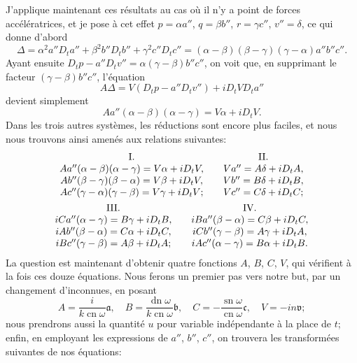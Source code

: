 \documentclass[11pt,leqno,oneside,letterpaper]{book}[2005/09/16]
\DeclareMathOperator{\sn}{sn}
\DeclareMathOperator{\cn}{cn}
\DeclareMathOperator{\dn}{dn}
\begin{document}
J'applique maintenant ces r\'esultats au cas o\`u il n'y a point de forces
acc\'el\'eratrices, et je pose \`a cet effet
$p=\alpha a''$, $q=\beta b''$, $r=\gamma c''$, $v''=\delta$, ce qui donne d'abord
\[
\Delta = \alpha^2 a'' D_t a'' + \beta^2 b'' D_t b'' + \gamma^2 c'' D_t c''
  = (\alpha-\beta)(\beta-\gamma)(\gamma-\alpha) a'' b'' c''.
\]
Ayant ensuite $D_t p - a'' D_t v'' = \alpha(\gamma-\beta)b''c''$, on voit que, en supprimant le
facteur $(\gamma-\beta)b''c''$, l'\'equation
\[
A\Delta = V (D_t p - a'' D_t v'') + i D_t V D_t a''
\]
devient simplement
\[
Aa'' (\alpha-\beta)(\alpha-\gamma) = V\alpha + i D_t V.
\]
Dans les trois autres syst\`emes, les r\'eductions sont encore plus faciles, et
nous nous trouvons ainsi amen\'es aux relations suivantes:
\begin{gather*}
\begin{array}{c@{\qquad}c}
\text{I.} & \text{II.} \\
Aa''(\alpha -  \beta)(\alpha-\gamma) = V\alpha + iD_t V,
  & Va'' = A\delta + iD_t A, \\
Ab''(\beta  - \gamma)(\beta -\alpha) = V\beta  + iD_t V,
  & Vb'' = B\delta + iD_t B, \\
Ac''(\gamma - \alpha)(\gamma-\beta ) = V\gamma + iD_t V;
  & Vc'' = C\delta + iD_t C;
\end{array}
\\
\begin{array}{c@{\qquad}c}
\text{III.} & \text{IV.} \\
iCa'' (\alpha-\gamma) = B\gamma + iD_t B,
  &  iBa'' ( \beta -\alpha) = C\beta  + iD_t C, \\
iAb'' (\beta -\alpha) = C\alpha + iD_t C,
  &  iCb'' ( \gamma- \beta) = A\gamma + iD_t A, \\
iBc'' (\gamma-\beta ) = A\beta + iD_t A;
  &  iAc'' ( \alpha-\gamma) = B\alpha + iD_t B.
\end{array}
\end{gather*}
La question est maintenant d'obtenir quatre fonctions $A$, $B$, $C$, $V$, qui
v\'erifient \`a la fois ces douze \'equations. Nous ferons un premier pas vers
notre but, par un changement d'inconnues, en posant
\[
A = \frac{i}{k\cn\omega}\mathfrak{a},
\quad
B = \frac{\dn\omega}{k\cn\omega}\mathfrak{b},
\quad
C =-\frac{\sn\omega}{\cn\omega} \mathfrak{c},
\quad
V = -in\mathfrak{v};
\]
nous prendrons aussi la quantit\'e $u$ pour variable ind\'ependante \`a la place
de $t$; enfin, en employant les expressions de $a''$, $b''$, $c''$, on trouvera les
transform\'ees suivantes de nos \'equations:
\end{document}
